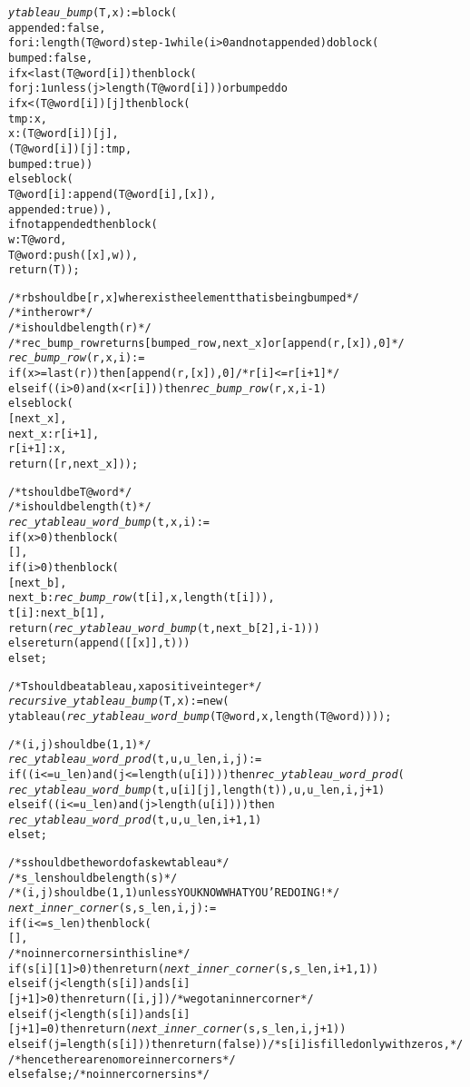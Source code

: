 \begin{alltt}
\emph{ytableau\_bump} (T, x) := block (
  appended : false,
  for i : length (T@word) step -1 while (i > 0 and not appended) do block (
    bumped : false,
    if x < last (T@word[i]) then block (
      for j : 1 unless (j>length (T@word[i])) or bumped do
      if x < (T@word[i])[j] then block (
        tmp : x,
        x : (T@word[i])[j],
        (T@word[i])[j] : tmp,
        bumped : true))
    else block (
      T@word[i] : append (T@word[i], [x]),
      appended : true)),
  if not appended then block ( 
    w : T@word,
    T@word : push ([x], w)),
  return (T));

/* rb should be [r, x] where x is the element that is being bumped */
/* in the row r */
/* i should be length (r) */
/* rec\_bump\_row returns [bumped\_row, next\_x] or [append (r,[x]), 0]  */
\emph{rec\_bump\_row} (r, x, i) :=
if (x >= last (r)) then [append (r, [x]), 0] /* r[i] <= r[i+1] */
else if ((i > 0) and (x < r[i])) then \emph{rec\_bump\_row} (r, x, i-1)
else block (
  [next\_x],
  next\_x : r[i+1],
  r[i+1] : x,
  return ([r, next\_x]));

/* t should be T@word */
/* i should be length (t) */
\emph{rec\_ytableau\_word\_bump} (t, x, i) :=
if (x > 0) then block (
  [],
  if (i > 0) then block (
    [next\_b],
    next\_b : \emph{rec\_bump\_row} (t[i], x, length (t[i])),
    t[i] : next\_b[1],
    return (\emph{rec\_ytableau\_word\_bump} (t, next\_b[2], i-1)))
  else return (append ([[x]], t)))
else t;

/* T should be a tableau, x a positive integer */
\emph{recursive\_ytableau\_bump} (T, x) := new (
  ytableau (\emph{rec\_ytableau\_word\_bump} (T@word, x, length (T@word))));

/* (i,j) should be (1,1) */
\emph{rec\_ytableau\_word\_prod} (t, u, u\_len, i, j) :=
if ((i <= u\_len) and (j <= length (u[i]))) then \emph{rec\_ytableau\_word\_prod} (
  \emph{rec\_ytableau\_word\_bump} (t, u[i][j], length (t)), u, u\_len, i, j+1)
else if ((i <= u\_len) and (j > length (u[i]))) then
  \emph{rec\_ytableau\_word\_prod} (t, u, u\_len, i+1, 1)
else t;

/* s should be the word of a skew tableau */
/* s\_len should be length(s) */
/* (i,j) should be (1,1) unless YOU KNOW WHAT YOU'RE DOING! */
\emph{next\_inner\_corner} (s, s\_len, i, j) :=
if (i <= s\_len) then block (
  [],
  /* no inner corners in this line */
  if (s[i][1] > 0) then return (\emph{next\_inner\_corner} (s, s_len, i+1, 1))
  else if (j < length (s[i]) and s[i][j+1] > 0) then return ([i, j]) /* we got an inner corner */
  else if (j < length (s[i]) and s[i][j+1] = 0) then return (\emph{next\_inner\_corner} (s, s\_len, i, j+1))
  else if (j = length (s[i])) then return (false)) /* s[i] is filled only with zeros, */
                                                  /* hence there are no more inner corners */
else false; /* no inner corners in s */


\end{alltt}
